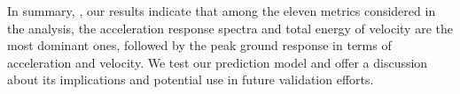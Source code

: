 
In summary, , our results indicate that
among the eleven metrics considered in the analysis, the acceleration response spectra and total energy of velocity are the most dominant ones, followed by the peak ground response in terms of acceleration and velocity. We test our prediction model and offer a discussion about its implications and potential use in future validation efforts.
